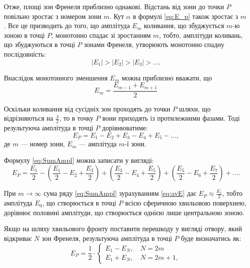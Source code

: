Отже, площі зон Френеля приблизно однакові. Відстань
від зони до точки $ P $ повільно зростає з номером зони $ m $. Кут $ \alpha $ в формулі \eqref{eq:E_p} також зростає з $ m $. Все це призводить до того, що амплітуда $ E_m $ коливання, що збуджується $ m $-ю зоною в точці $ P $, монотонно спадає зі зростанням $ m $, тобто, амплітуди коливань, що збуджуються в точці $ P $ зонами Френеля, утворюють монотонно спадну послідовність:
\begin{equation*}
    |E_1| > |E_2| > |E_3| > \ldots.
\end{equation*}

Внаслідок монотонного зменшення $ E_m $ можна приблизно вважати, що
\begin{equation}\label{eq:avE}
    E_m = \frac{E_{m - 1} + E_{m + 1}}{2}
\end{equation}

Оскільки коливання від сусідніх зон проходять до точки $ P $ шляхи, що відрізняються на $ \frac\lambda2 $, то в точку $ P $
вони приходять із протилежними фазами. Тоді
результуюча амплітуда в точці $ P $ дорівнюватиме:
\begin{equation}\label{eq:SumAmpl}
    E_P = E_1 - E_2 + E_3 - E_4 + E_5 - \ldots,
\end{equation}
де $ m $ --- номер зони, $ E_m $ --- амплітуда $ m $-ї зони.


Формулу \eqref{eq:SumAmpl} можна записати у вигляді:
\begin{equation*}
    E_P = \frac{E_1}{2} - \left(\frac{E_1}{2} - E_2 + \frac{E_3}{2} \right) +   \left(\frac{E_3}{2} - E_4 + \frac{E_5}{2} \right) +  \left(\frac{E_5}{2} - E_6 + \frac{E_7}{2} \right)  + \ldots.
\end{equation*}

При $ m \to \infty $ сума ряду \eqref{eq:SumAmpl} зурахуванням \eqref{eq:avE} дає $ E_P \approx \frac{E_1}{2} $, тобто амплітуда $ E_0 $, що створюється в точці $ P $ всією сферичною хвильовою поверхнею, дорівнює половині амплітуди, що створюється однією лише центральною зоною.

Якщо на шляху хвильового фронту поставити перешкоду у вигляді отвору, який відкриває $N$ зон Френеля, результуюча амплітуда в точці $P$ буде визначатись як:
\begin{equation}\label{eq:Amplitide_of_holes}
    E_P =\frac12\cdot
    \begin{cases}
        E_1 - E_N, \quad N = 2m \\
        E_1 + E_N, \quad N = 2m+1,
    \end{cases}
\end{equation}

